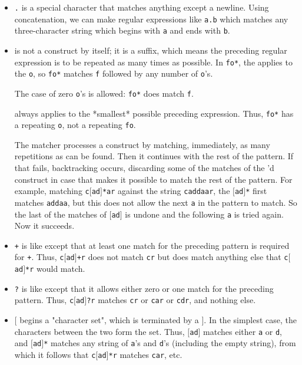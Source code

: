 \begin{itemize}
\itemsep=0pt

\item \rtfsp
{\tt .} is a special character that matches anything except a newline. 
Using concatenation, we can make regular expressions like {\tt a.b}
which matches any three-character string which begins with {\tt a}
and ends with {\tt b}.

\item \rtfsp
{\tt *} is not a construct by itself; it is a suffix, which means the
preceding regular expression is to be repeated as many times as
possible. In {\tt fo*}, the {\tt *} applies to the {\tt o}, so {\tt fo*}
matches {\tt f} followed by any number of {\tt o}'s.

The case of zero {\tt o}'s is allowed: {\tt fo*} does match {\tt f}.

{\tt *} always applies to the *smallest* possible preceding
expression. Thus, {\tt fo*} has a repeating {\tt o}, not a repeating
{\tt fo}.

The matcher processes a {\tt *} construct by matching, immediately,
as many repetitions as can be found. Then it continues with the
rest of the pattern. If that fails, backtracking occurs,
discarding some of the matches of the {\tt *}'d construct in case
that makes it possible to match the rest of the pattern. For
example, matching {\tt c$[$ad$]$*ar} against the string {\tt caddaar}, the
{\tt $[$ad$]$*} first matches {\tt addaa}, but this does not allow the next
{\tt a} in the pattern to match. So the last of the matches of
{\tt $[$ad$]$} is undone and the following {\tt a} is tried again. Now it
succeeds.



\item \rtfsp
{\tt +} is like {\tt *} except that at least one match for the preceding
pattern is required for {\tt +}. Thus, {\tt c$[$ad$]$+r} does not match
{\tt cr} but does match anything else that {\tt c$[$ad$]$*r} would match.

\item \rtfsp
{\tt ?} is like {\tt *} except that it allows either zero or one match
for the preceding pattern. Thus, {\tt c$[$ad$]$?r} matches {\tt cr} or
{\tt car} or {\tt cdr}, and nothing else.

\item \rtfsp
{\tt $[$} begins a "character set", which is terminated by a {\tt $]$}. In
the simplest case, the characters between the two form the set. 
Thus, {\tt $[$ad$]$} matches either {\tt a} or {\tt d}, and {\tt $[$ad$]$*} matches any
string of {\tt a}'s and {\tt d}'s (including the empty string), from
which it follows that {\tt c$[$ad$]$*r} matches {\tt car}, etc.


\end{itemize}

